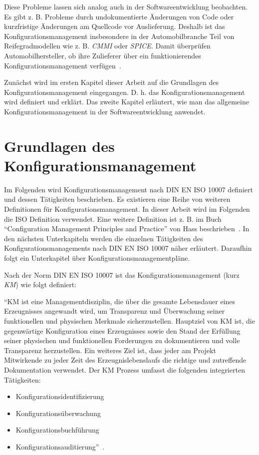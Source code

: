 \documentclass[runningheads,a4paper]{uwsese}
\begin{document}
Diese Probleme lassen sich analog auch in der Softwareentwicklung beobachten.
Es gibt z. B. Probleme durch undokumentierte Änderungen von Code oder
kurzfristige Änderungen am Quellcode vor Auslieferung. Deshalb ist das
Konfigurationsmanagement insbesondere in der
Automobilbranche Teil von Reifegradmodellen wie z. B. {\em CMMI} oder
{\em SPICE}. Damit überprüfen Automobilhersteller, ob ihre Zulieferer über ein
funktionierendes Konfigurationsmanagement verfügen~\cite[S. 2f]{weischedel2002}.

Zunächst wird im ersten Kapitel dieser Arbeit auf die Grundlagen des
Konfigurationsmanagement eingegangen. D. h. das Konfigurationsmanagement wird
definiert und erklärt.
Das zweite Kapitel erläutert, wie man das allgemeine Konfigurationsmanagement in
der Softwareentwicklung anwendet.

\section{Grundlagen des Konfigurationsmanagement}
Im Folgenden wird Konfigurationsmanagement nach DIN EN ISO 10007 definiert und
dessen Tätigkeiten beschrieben. Es existieren eine Reihe von weiteren
Definitionen für Konfigurationsmanagement.
In dieser Arbeit wird im Folgenden die ISO Definition verwendet. Eine weitere
Definition ist z. B. im Buch ``Configuration Management Principles and
Practice'' von Hass beschrieben~\cite{Hass:2003:CMP:582584}. In den nächsten
Unterkapiteln werden die einzelnen Tätigkeiten des Konfigurationsmanagements
nach DIN EN ISO 10007 näher erläutert. Daraufhin folgt ein Unterkapitel über
Konfigurationsmanagementpläne.

Nach der Norm DIN EN ISO 10007 ist das Konfigurationsmanagement (kurz {\em KM})
wie folgt definiert:

``KM ist eine Managementdisziplin, die über die gesamte Lebensdauer eines
Erzeugnisses angewandt wird, um Transparenz und Überwachung seiner funktionellen
und physischen Merkmale sicherzustellen. Hauptziel von KM ist, die
gegenwärtige Konfiguration eines Erzeugnisses sowie den Stand der Erfüllung
seiner physischen und funktionellen Forderungen zu dokumentieren und volle
Transparenz herzustellen. Ein weiteres Ziel ist, dass jeder am Projekt
Mitwirkende zu jeder Zeit des Erzeugnislebenslaufs die richtige und zutreffende
Dokumentation verwendet. Der KM Prozess umfasst die folgenden integrierten
Tätigkeiten:

\begin{itemize}
	\item Konfigurationsidentifizierung
	\item Konfigurationsüberwachung
	\item Konfigurationsbuchführung
	\item Konfigurationsauditierung''~\cite{ISO10007}.
\end{itemize}
\end{document}
